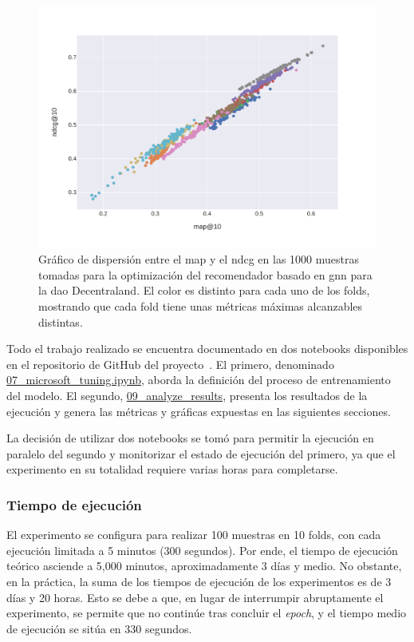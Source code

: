 \begin{figure}[bt]
\begin{minipage}{.48\textwidth}
        \includegraphics[width=\linewidth]{figures/04_implementacion/scatter_ndcg_map.pdf}
        \caption[Gráfico de dispersión entre el MAP y el nDCG en las 1000 muestras tomadas del recomendador GNN para Decentraland.]{Gráfico de dispersión entre el \gls{map} y el \gls{ndcg} en las 1000 muestras tomadas para la optimización del recomendador basado en \gls{gnn} para la \gls{dao} Decentraland. El color es distinto para cada uno de los folds, mostrando que cada fold tiene unas métricas máximas alcanzables distintas.}
        \label{fig:scatter_ndcg_map}
    \end{minipage}
\end{figure}

Todo el trabajo realizado se encuentra documentado en dos notebooks disponibles en el repositorio de GitHub del proyecto~\cite{davo_daviddavoupm-tfm-notebooks_2024}. El primero, denominado \url{07\_microsoft\_tuning.ipynb}, aborda la definición del proceso de entrenamiento del modelo. El segundo, \url{09\_analyze\_results}, presenta los resultados de la ejecución y genera las métricas y gráficas expuestas en las siguientes secciones.

La decisión de utilizar dos notebooks se tomó para permitir la ejecución en paralelo del segundo y monitorizar el estado de ejecución del primero, ya que el experimento en su totalidad requiere varias horas para completarse.

\subsubsection{Tiempo de ejecución}

El experimento se configura para realizar 100 muestras en 10 folds, con cada ejecución limitada a 5 minutos (300 segundos). Por ende, el tiempo de ejecución teórico asciende a 5,000 minutos, aproximadamente 3 días y medio. No obstante, en la práctica, la suma de los tiempos de ejecución de los experimentos es de 3 días y 20 horas. Esto se debe a que, en lugar de interrumpir abruptamente el experimento, se permite que no continúe tras concluir el \textit{epoch}, y el tiempo medio de ejecución se sitúa en 330 segundos.

